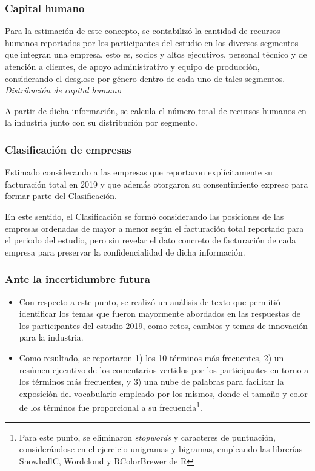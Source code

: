\subsubsection{Capital humano}

Para la estimación de este concepto, se contabilizó la cantidad de recursos humanos reportados por los participantes del estudio en los diversos segmentos que integran una empresa, esto es, socios y altos ejecutivos, personal técnico y de atención a clientes, de apoyo administrativo y equipo de producción, considerando el desglose por género dentro de cada uno de tales segmentos.\\

\noindent \emph{Distribución de capital humano}

A partir de dicha información, se calcula el número total de recursos humanos en la industria junto con su distribución por segmento.

\subsubsection{Clasificación de empresas}

Estimado considerando a las empresas que reportaron explícitamente su facturación total en 2019 y que además otorgaron su consentimiento expreso para formar parte del Clasificación. 

En este sentido, el Clasificación se formó considerando las posiciones de las empresas ordenadas de mayor a menor según el facturación total reportado para el periodo del estudio, pero sin revelar el dato concreto de facturación de cada empresa para preservar la confidencialidad de dicha información.

\subsubsection{Ante la incertidumbre futura}

\begin{itemize}
\item Con respecto a este punto, se realizó un análisis de texto que permitió identificar los temas que fueron mayormente abordados en las respuestas de los participantes del estudio 2019, como retos, cambios y temas de innovación para la industria.
\item Como resultado, se reportaron 1) los 10 términos más frecuentes, 2) un resúmen ejecutivo de los comentarios vertidos por los participantes en torno a los términos más frecuentes, y 3) una nube de palabras para facilitar la exposición del vocabulario empleado por los mismos, donde el tamaño y color de los términos fue proporcional a su frecuencia\footnote{Para este punto, se eliminaron \emph{stopwords} y caracteres de puntuación, considerándose en el ejercicio unigramas y bigramas, empleando las librerías SnowballC, Wordcloud y RColorBrewer de R}.
\end{itemize}

